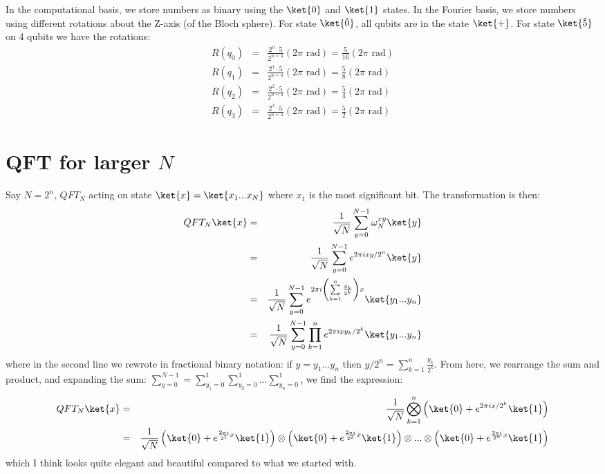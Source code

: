 \documentclass[preprint,aps,prd,nofootinbib,superscriptaddress]{revtex4-2}
\begin{document}
%
In the computational basis, we store numbers as binary using the $\ket{0}$ and $\ket{1}$ states. In the Fourier basis, we store numbers using different rotations about the Z-axis (of the Bloch sphere). For state $\ket{\tilde{0}}$, all qubits are in the state $\ket{+}$. For state $\ket{\tilde{5}}$ on 4 qubits we have the rotations:
%
\begin{eqnarray} 
R(q_0) &=& \frac{2^0\cdot 5}{2^{n=4}}(2\pi \text{ rad}) = \frac{5}{16}(2\pi \text{ rad})
\nonumber \\
R(q_1) &=& \frac{2^1\cdot 5}{2^{n=4}}(2\pi \text{ rad}) = \frac{5}{8}(2\pi \text{ rad})
\nonumber \\
R(q_2) &=& \frac{2^2\cdot 5}{2^{n=4}}(2\pi \text{ rad}) = \frac{5}{4}(2\pi \text{ rad})
\nonumber \\
R(q_3) &=& \frac{2^3\cdot 5}{2^{n=4}}(2\pi \text{ rad}) = \frac{5}{2}(2\pi \text{ rad})
\end{eqnarray}
%

\section{QFT for larger $N$}
%
Say $N=2^n$, $QFT_N$ acting on state $\ket{x} = \ket{x_1...x_N}$ where $x_1$ is the most significant bit. The transformation is then:
%
\begin{eqnarray} 
QFT_N \ket{x} &=& \frac{1}{\sqrt{N}} \sum \limits _{y=0} ^{N-1} \omega_N^{xy} \ket{y}
\nonumber \\
&=& \frac{1}{\sqrt{N}} \sum \limits _{y=0} ^{N-1} e^{2\pi i x y/2^n} \ket{y}
\nonumber \\
&=& \frac{1}{\sqrt{N}} \sum \limits _{y=0} ^{N-1} e^{2\pi i \left(\sum\limits _{k=1} ^n \frac{y_k}{2^k}\right)x} \ket{y_1 ...y_n}
\nonumber \\
&=& \frac{1}{\sqrt{N}} \sum \limits _{y=0} ^{N-1} \prod\limits _{k=1} ^n e^{2\pi i x y_k/ 2^k} \ket{y_1 ...y_n}
\end{eqnarray}
%
where in the second line we rewrote in fractional binary notation: if $y=y_1 ... y_n$ then $y/2^n = \sum\limits _{k=1} ^n \frac{y_k}{2^k}$. From here, we rearrange the sum and product, and expanding the sum: $\sum \limits _{y=0} ^{N-1} = \sum \limits _{y_1=0} ^{1} \sum \limits _{y_2=0} ^{1} ... \sum \limits _{y_n=0} ^{1}$, we find the expression:
%
\begin{eqnarray} \label{eqn:QFT_N}
QFT_N \ket{x} &=& \frac{1}{\sqrt{N}} \bigotimes \limits _{k=1} ^n \left(\ket{0} + e^{2\pi i x/ 2^k} \ket{1}\right)
\nonumber \\
&=& \frac{1}{\sqrt{N}} \left(\ket{0} + e^{\frac{2\pi i}{2^1} x} \ket{1}\right) \otimes \left(\ket{0} + e^{\frac{2\pi i}{2^2} x} \ket{1}\right) \otimes ... \otimes \left(\ket{0} + e^{\frac{2\pi i}{2^n} x} \ket{1}\right)
\end{eqnarray} 
%
which I think looks quite elegant and beautiful compared to what we started with. 
%
\end{document}
